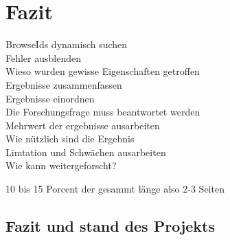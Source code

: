 
\chapter{Fazit}
BrowseIds dynamisch suchen\\
Fehler ausblenden\\

Wieso wurden gewisse Eigenschaften  getroffen\\

Ergebnisse zusammenfassen\\

Ergebnisse einordnen\\

Die Forschungsfrage muss beantwortet werden\\

Mehrwert der ergebnisse ausarbeiten\\

Wie nützlich sind die Ergebnis\\

Limtation und Schwächen ausarbeiten\\

Wie kann weitergeforscht?

10 bis 15 Porcent der gesammt länge also 2-3 Seiten

\section{Fazit und stand des Projekts}



